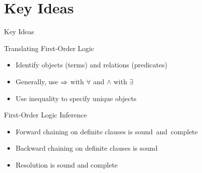\documentclass[14pt]{beamer}
\begin{document}
\part{Key Ideas}
\begin{frame}{Key Ideas}
	\begin{block}{Translating First-Order Logic}
		\begin{itemize}
			\item Identify objects (terms) and relations (predicates)
			\item Generally, use $\Rightarrow$ with $\forall$ and $\land$ with $\exists$
			\item Use inequality to specify unique objects
		\end{itemize}
	\end{block}
	\begin{block}{First-Order Logic Inference}
		\begin{itemize}
			\item Forward chaining on definite clauses is \mbox{sound and complete}
			\item Backward chaining on definite clauses is sound
			\item Resolution is sound and complete
		\end{itemize}
	\end{block}
\end{frame}
\end{document}
